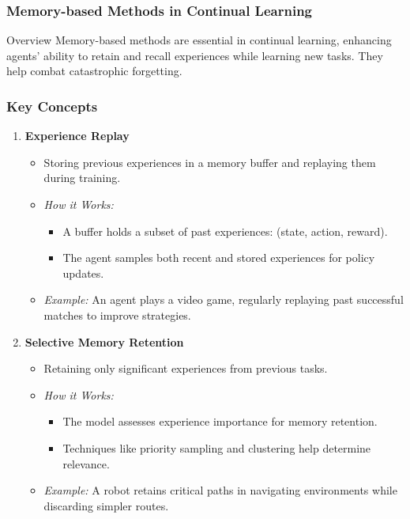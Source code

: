 \documentclass[aspectratio=169]{beamer}
\begin{document}
\begin{frame}[fragile]
    \frametitle{Memory-based Methods in Continual Learning}
    \begin{block}{Overview}
        Memory-based methods are essential in continual learning, enhancing agents' ability to retain and recall experiences while learning new tasks. They help combat catastrophic forgetting.
    \end{block}
\end{frame}

\begin{frame}[fragile]
    \frametitle{Key Concepts}
    \begin{enumerate}
        \item \textbf{Experience Replay}
        \begin{itemize}
            \item Storing previous experiences in a memory buffer and replaying them during training.
            \item \textit{How it Works:}
            \begin{itemize}
                \item A buffer holds a subset of past experiences: (state, action, reward).
                \item The agent samples both recent and stored experiences for policy updates.
            \end{itemize}
            \item \textit{Example:} 
            An agent plays a video game, regularly replaying past successful matches to improve strategies.
        \end{itemize}

        \item \textbf{Selective Memory Retention}
        \begin{itemize}
            \item Retaining only significant experiences from previous tasks.
            \item \textit{How it Works:}
            \begin{itemize}
                \item The model assesses experience importance for memory retention.
                \item Techniques like priority sampling and clustering help determine relevance.
            \end{itemize}
            \item \textit{Example:} 
            A robot retains critical paths in navigating environments while discarding simpler routes.
        \end{itemize}
    \end{enumerate}
\end{frame}
\end{document}
